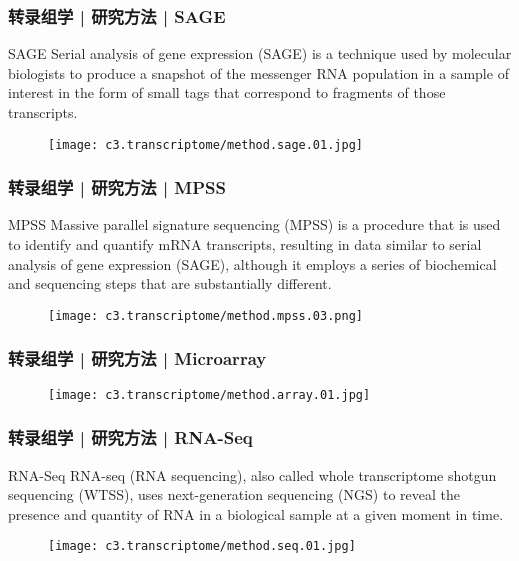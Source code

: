 \begin{frame}
  \frametitle{转录组学 | 研究方法 | SAGE}
  \begin{block}{SAGE}
    Serial analysis of gene expression (SAGE) is a technique used by molecular biologists to produce a snapshot of the messenger RNA population in a sample of interest in the form of small tags that correspond to fragments of those transcripts.
  \end{block}
  \begin{figure}
    \centering
    \texttt{[image: c3.transcriptome/method.sage.01.jpg]}
  \end{figure}
\end{frame}

\begin{frame}
  \frametitle{转录组学 | 研究方法 | MPSS}
  {\footnotesize
  \begin{block}{MPSS}
    Massive parallel signature sequencing (MPSS) is a procedure that is used to identify and quantify mRNA transcripts, resulting in data similar to serial analysis of gene expression (SAGE), although it employs a series of biochemical and sequencing steps that are substantially different.
  \end{block}
  }
  \begin{figure}
    \centering
    \texttt{[image: c3.transcriptome/method.mpss.03.png]}
  \end{figure}
\end{frame}

\begin{frame}
  \frametitle{转录组学 | 研究方法 | Microarray}
  \begin{figure}
    \centering
    \texttt{[image: c3.transcriptome/method.array.01.jpg]}
  \end{figure}
\end{frame}

\begin{frame}
  \frametitle{转录组学 | 研究方法 | RNA-Seq}
  {\footnotesize
  \begin{block}{RNA-Seq}
    RNA-seq (RNA sequencing), also called whole transcriptome shotgun sequencing (WTSS), uses next-generation sequencing (NGS) to reveal the presence and quantity of RNA in a biological sample at a given moment in time.
  \end{block}
  }
  \begin{figure}
    \centering
    \texttt{[image: c3.transcriptome/method.seq.01.jpg]}
  \end{figure}
\end{frame}

